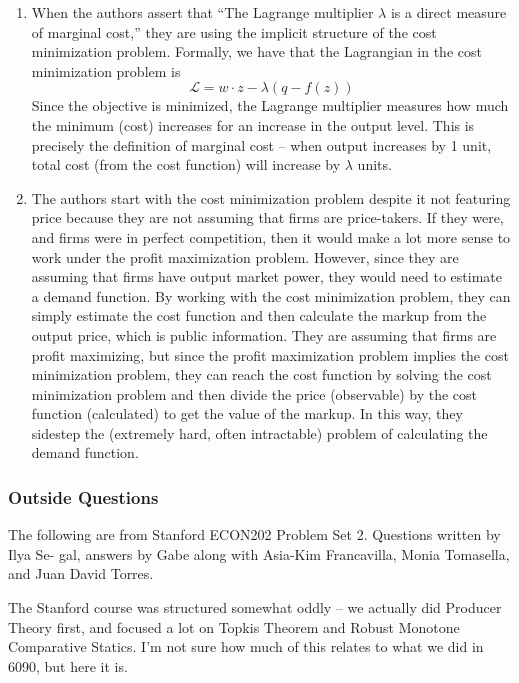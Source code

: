 \documentclass[12pt]{article}
\begin{document}
\begin{enumerate}
	\begin{enumerate}
		\item When the authors assert that ``The Lagrange multiplier $\lambda$ is a direct measure of marginal cost,'' they are using the implicit structure of the cost minimization problem. Formally, we have that the Lagrangian in the cost minimization problem is
		\[
		\mathcal{L} = w \cdot z - \lambda (q - f(z))
		\]
		Since the objective is minimized, the Lagrange multiplier measures how much the minimum (cost) increases for an increase in the output level. This is precisely the definition of marginal cost -- when output increases by 1 unit, total cost (from the cost function) will increase by $\lambda$ units.
		\item The authors start with the cost minimization problem despite it not featuring price because they are not assuming that firms are price-takers. If they were, and firms were in perfect competition, then it would make a lot more sense to work under the profit maximization problem. However, since they are assuming that firms have output market power, they would need to estimate a demand function. By working with the cost minimization problem, they can simply estimate the cost function and then calculate the markup from the output price, which is public information. They are assuming that firms are profit maximizing, but since the profit maximization problem implies the cost minimization problem, they can reach the cost function by solving the cost minimization problem and then divide the price (observable) by the cost function (calculated) to get the value of the markup. In this way, they sidestep the (extremely hard, often intractable) problem of calculating the demand function.
	\end{enumerate}
\end{enumerate}

\subsubsection{Outside Questions}

The following are from Stanford ECON202 Problem Set 2. Questions written by Ilya Se- gal, answers by Gabe along with Asia-Kim Francavilla, Monia Tomasella, and Juan David Torres.

\begin{remark}
	The Stanford course was structured somewhat oddly -- we actually did Producer Theory first, and focused a lot on Topkis Theorem and Robust Monotone Comparative Statics. I'm not sure how much of this relates to what we did in 6090, but here it is.
\end{remark}
\end{document}
